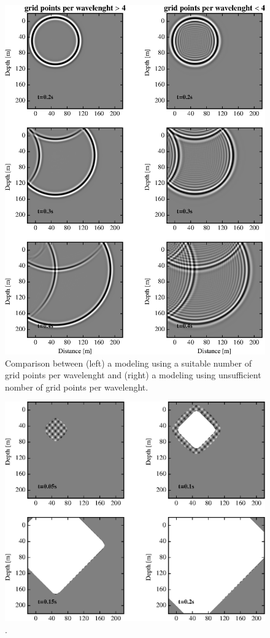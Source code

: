\documentclass{gnulike}
\begin{document}
\clearpage\newpage
\begin{figure}[!ht]
  \centering
  \includegraphics[scale=1.0]{fig/validation_dispersion.eps}
  \caption{Comparison between (left) a modeling using a suitable number of grid points per wavelenght and (right) a modeling using unsufficient nomber of grid points per wavelenght.}
  \label{fig:dispersion-validation}
\end{figure}

\begin{figure}[!ht]
  \centering
  \includegraphics[scale=1.0]{fig/validation_courant.eps}
  \caption{.}
  \label{fig:courant-validation}
\end{figure}
\end{document}
